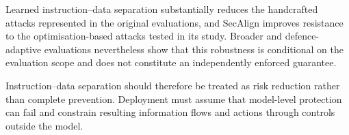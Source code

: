 Learned instruction--data separation substantially reduces the handcrafted
attacks represented in the original evaluations, and SecAlign improves
resistance to the optimisation-based attacks tested in its study. Broader and
defence-adaptive evaluations nevertheless show that this robustness is
conditional on the evaluation scope and does not constitute an independently
enforced guarantee.

Instruction--data separation should therefore be treated as risk reduction
rather than complete prevention. Deployment must assume that model-level
protection can fail and constrain resulting information flows and actions
through controls outside the model.